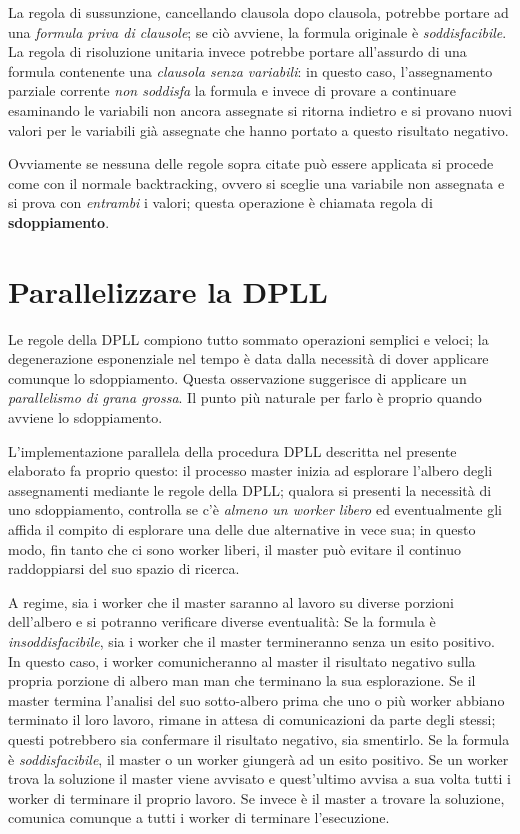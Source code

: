 \documentclass[12pt, a4paper, twosides]{report}
\begin{document}
La regola di sussunzione, cancellando clausola dopo clausola, potrebbe portare ad una \textit{formula priva di clausole}; se ciò avviene, la formula originale è \textit{soddisfacibile}. La regola di risoluzione unitaria invece potrebbe portare all'assurdo di una formula contenente una \textit{clausola senza variabili}: in questo caso, l'assegnamento parziale corrente \textit{non soddisfa} la formula e invece di provare a continuare esaminando le variabili non ancora assegnate si ritorna indietro e si provano nuovi valori per le variabili già assegnate che hanno portato a questo risultato negativo.

Ovviamente se nessuna delle regole sopra citate può essere applicata si procede come con il normale backtracking, ovvero si sceglie una variabile non assegnata e si prova con \textit{entrambi} i valori; questa operazione è chiamata regola di \textbf{sdoppiamento}.





\section{Parallelizzare la DPLL}

Le regole della DPLL compiono tutto sommato operazioni semplici e veloci; la degenerazione esponenziale nel tempo è data dalla necessità di dover applicare comunque lo sdoppiamento. Questa osservazione suggerisce di applicare un \textit{parallelismo di grana grossa}. Il punto più naturale per farlo è proprio quando avviene lo sdoppiamento.

L'implementazione parallela della procedura DPLL descritta nel presente elaborato fa proprio questo: il processo master inizia ad esplorare l'albero degli assegnamenti mediante le regole della DPLL; qualora si presenti la necessità di uno sdoppiamento, controlla se c'è \textit{almeno un worker libero} ed eventualmente gli affida il compito di esplorare una delle due alternative in vece sua; in questo modo, fin tanto che ci sono worker liberi, il master può evitare il continuo raddoppiarsi del suo spazio di ricerca.

A regime, sia i worker che il master saranno al lavoro su diverse porzioni dell'albero e si potranno verificare diverse eventualità:
Se la formula è \textit{insoddisfacibile}, sia i worker che il master termineranno senza un esito positivo. In questo caso, i worker comunicheranno al master il risultato negativo sulla propria porzione di albero man man che terminano la sua esplorazione. Se il master termina l'analisi del suo sotto-albero prima che uno o più worker abbiano terminato il loro lavoro, rimane in attesa di comunicazioni da parte degli stessi; questi potrebbero sia confermare il risultato negativo, sia smentirlo.
Se la formula è \textit{soddisfacibile}, il master o un worker giungerà ad un esito positivo. Se un worker trova la soluzione il master viene avvisato e quest'ultimo avvisa a sua volta tutti i worker di terminare il proprio lavoro. Se invece è il master a trovare la soluzione, comunica comunque a tutti i worker di terminare l'esecuzione.
\end{document}

